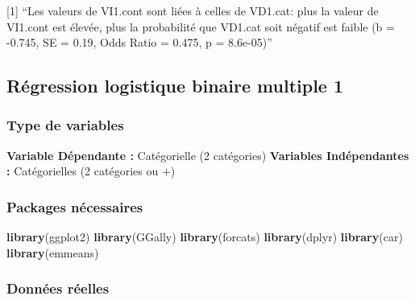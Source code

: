 \documentclass[
]{book}
\newenvironment{Shaded}{\begin{snugshade}}{\end{snugshade}}
\newcommand{\KeywordTok}[1]{\textcolor[rgb]{0.13,0.29,0.53}{\textbf{#1}}}
\newcommand{\NormalTok}[1]{#1}
\begin{document}
{[}1{]} ``Les valeurs de VI1.cont sont liées à celles de VD1.cat: plus la valeur de VI1.cont est élevée, plus la probabilité que VD1.cat soit négatif est faible (b = -0.745, SE = 0.19, Odds Ratio = 0.475, p = 8.6e-05)''

\hypertarget{ruxe9gression-logistique-binaire-multiple-1}{%
\subsection{Régression logistique binaire multiple 1}\label{ruxe9gression-logistique-binaire-multiple-1}}

\hypertarget{type-de-variables-9}{%
\subsubsection{Type de variables}\label{type-de-variables-9}}

\textbf{Variable Dépendante :} Catégorielle (2 catégories)
\textbf{Variables Indépendantes :} Catégorielles (2 catégories ou +)

\hypertarget{packages-nuxe9cessaires-9}{%
\subsubsection{Packages nécessaires}\label{packages-nuxe9cessaires-9}}

\begin{Shaded}
\begin{Highlighting}[]
\KeywordTok{library}\NormalTok{(ggplot2)}
\KeywordTok{library}\NormalTok{(GGally)}
\KeywordTok{library}\NormalTok{(forcats)}
\KeywordTok{library}\NormalTok{(dplyr)}
\KeywordTok{library}\NormalTok{(car)}
\KeywordTok{library}\NormalTok{(emmeans)}
\end{Highlighting}
\end{Shaded}

\hypertarget{donnuxe9es-ruxe9elles-9}{%
\subsubsection{Données réelles}\label{donnuxe9es-ruxe9elles-9}}
\end{document}
